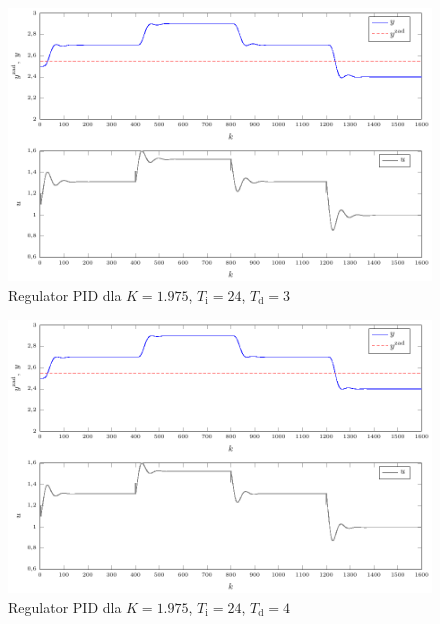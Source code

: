 \begin{figure}[tb] 
\centering 
\includegraphics[scale=1]{rysunki/zapisz_pdf/PID_K=1.975_Ti=24.00_Td=3.00.pdf} 
\caption{Regulator PID dla $K=\num{1.975}$, $T_{\mathrm{i}}=24$, $T_{\mathrm{d}}=3$} 
\label{r_pgfplots_PID_K=1.975_Ti=24.00_Td=3.00} 
\end{figure}

\begin{figure}[tb] 
\centering 
\includegraphics[scale=1]{rysunki/zapisz_pdf/PID_K=1.975_Ti=24.00_Td=4.00.pdf} 
\caption{Regulator PID dla $K=\num{1.975}$, $T_{\mathrm{i}}=24$, $T_{\mathrm{d}}=4$} 
\label{r_pgfplots_PID_K=1.975_Ti=24.00_Td=4.00} 
\end{figure}

